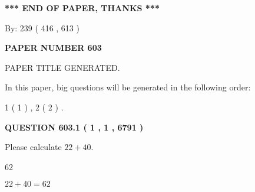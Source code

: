 \documentclass[12pt]{article}
\begin{document}
   
\vspace{1.0in} 
{\textbf{\large{ *** END OF PAPER, THANKS *** }}} 
   
   
\hspace{1.0in} By: 
 239 ( 416 ,  613 )
   
   
   
   
\newpage 
\setcounter{page}{ 
   603001 } 
   
   
   
   
 {\textbf{ \Large{ PAPER NUMBER  603  }}}
   
   
\vspace{0.2in}
   
   
   
   
   
   
   
   
 \vspace{0.2in}
 
 
 
 
   
   
 PAPER TITLE GENERATED.
   
   
   
\vspace{0.2in}
   
In this paper, big questions will be generated in the following order: 
   
   
   1 ( 1 )
 ,
   2 ( 2 )
 .
  
\vspace{0.2in}
  
{\textbf{\Large{QUESTION
603.1 
 ( 1 , 1 , 6791 )
}}}
  
  
 
Please calculate $ %
22 +  %
40 $.
 
 
 
\noindent{}
 
 

62
 
 
\noindent{}
 
 

 
 
 
\noindent{}
 
 

$ %
22 +  %
40=   %
62$
 
\end{document}
